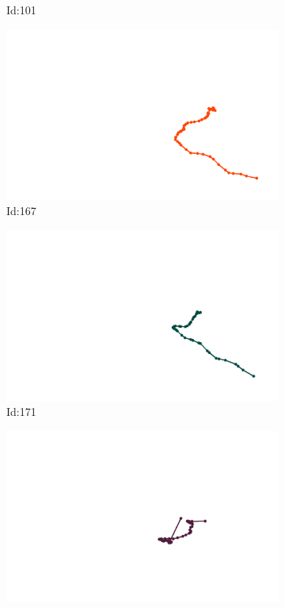 \documentclass[12pt,twoside]{report}
\begin{document}
\begin{figure}
\begin{subfigure}[b]{0.20\textwidth}
\caption{Id:101}
\end{subfigure}
\begin{subfigure}[b]{0.20\textwidth}
\centering
\includegraphics[width=\textwidth]{../../trajectories/167.png}
\caption{Id:167}
\end{subfigure}
\begin{subfigure}[b]{0.20\textwidth}
\centering
\includegraphics[width=\textwidth]{../../trajectories/171.png}
\caption{Id:171}
\end{subfigure}
\begin{subfigure}[b]{0.20\textwidth}
\centering
\includegraphics[width=\textwidth]{../../trajectories/281.png}

\end{subfigure}
\end{figure}
\end{document}
